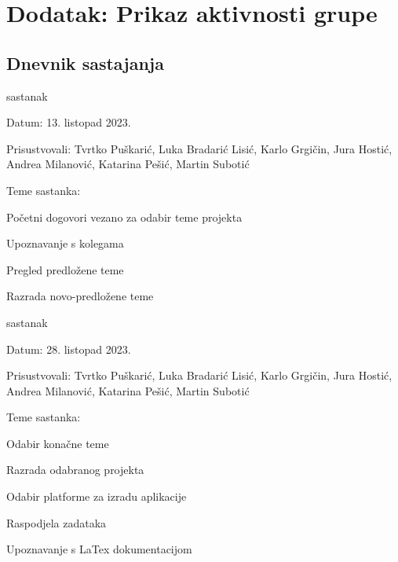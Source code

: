 \chapter*{Dodatak: Prikaz aktivnosti grupe}
		
		\section*{Dnevnik sastajanja}
		
		\begin{packed_enum}
			
			\item  sastanak
			\item[] \begin{packed_item}
				\item Datum: 13. listopad 2023.
				\item Prisustvovali: Tvrtko Puškarić, Luka Bradarić Lisić, Karlo Grgičin, Jura Hostić, Andrea Milanović, Katarina Pešić, Martin Subotić
				\item Teme sastanka:
				\begin{packed_item}
					\item Početni dogovori vezano za odabir teme projekta
					\item Upoznavanje s kolegama
					\item Pregled predložene teme
					\item Razrada novo-predložene teme
				\end{packed_item}
			\end{packed_item}
			
			\item  sastanak
			\item[] \begin{packed_item}
				\item Datum: 28. listopad 2023.
				\item Prisustvovali: Tvrtko Puškarić, Luka Bradarić Lisić, Karlo Grgičin, Jura Hostić, Andrea Milanović, Katarina Pešić, Martin Subotić
				\item Teme sastanka:
				\begin{packed_item}
					\item Odabir konačne teme
					\item Razrada odabranog projekta
					\item Odabir platforme za izradu aplikacije
					\item Raspodjela zadataka
					\item Upoznavanje s LaTex dokumentacijom
				\end{packed_item}
			\end{packed_item}
			

\end{packed_enum}
